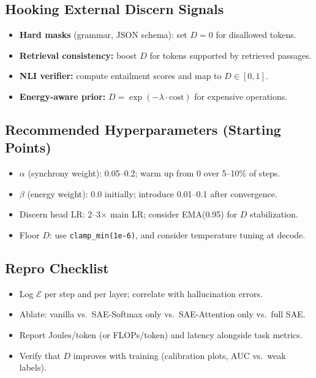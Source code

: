 \documentclass[11pt]{article}
\theoremstyle{plain}
\theoremstyle{definition}
\theoremstyle{remark}
\begin{document}
\subsection{Hooking External Discern Signals}

\begin{itemize}
  \item \textbf{Hard masks} (grammar, JSON schema): set $D=0$ for disallowed tokens.
  \item \textbf{Retrieval consistency:} boost $D$ for tokens supported by retrieved passages.
  \item \textbf{NLI verifier:} compute entailment scores and map to $D\in[0,1]$.
  \item \textbf{Energy-aware prior:} $D = \exp(-\lambda \cdot \mathrm{cost})$ for expensive operations.
\end{itemize}

\subsection{Recommended Hyperparameters (Starting Points)}
\begin{itemize}
  \item \(\alpha\) (synchrony weight): 0.05--0.2; warm up from 0 over 5--10\% of steps.
  \item \(\beta\) (energy weight): 0.0 initially; introduce 0.01--0.1 after convergence.
  \item Discern head LR: 2--3$\times$ main LR; consider EMA(0.95) for $D$ stabilization.
  \item Floor $D$: use \texttt{clamp\_min(1e-6)}, and consider temperature tuning at decode.
\end{itemize}

\subsection{Repro Checklist}
\begin{itemize}
  \item Log \(\mathcal{E}\) per step and per layer; correlate with hallucination errors.
  \item Ablate: vanilla vs.\ SAE-Softmax only vs.\ SAE-Attention only vs.\ full SAE.
  \item Report Joules/token (or FLOPs/token) and latency alongside task metrics.
  \item Verify that $D$ improves with training (calibration plots, AUC vs.\ weak labels).
\end{itemize}
\end{document}
